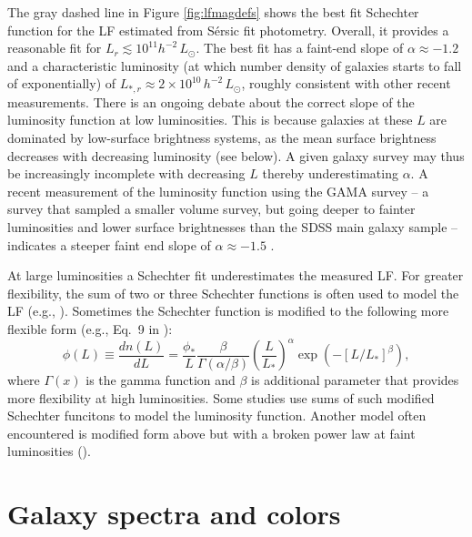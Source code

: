 The gray dashed line in Figure \ref{fig:lfmagdefs} shows the best fit Schechter function for the LF estimated from S\'ersic fit photometry. Overall, it provides a reasonable fit for $L_r\lesssim 10^{11}h^{-2}\, L_{\odot}$. The best fit has a faint-end slope of $\alpha\approx -1.2$ and a characteristic luminosity (at which number density of galaxies starts to fall of exponentially) of $L_{\ast,r}\approx 2\times 10^{10}\, h^{-2}\, L_{\odot}$, roughly consistent with other recent measurements. There is an ongoing debate about the correct slope of the luminosity function at low luminosities. This is because galaxies at these $L$ are dominated by low-surface brightness systems, as the mean surface brightness decreases with decreasing luminosity (see below). A given galaxy survey may thus be increasingly incomplete with decreasing $L$ thereby underestimating $\alpha$. A recent measurement of the luminosity function using the GAMA survey -- a survey that sampled a smaller volume survey, but going deeper to fainter luminosities and lower surface brightnesses than the SDSS main galaxy sample -- indicates a steeper faint end slope of $\alpha\approx -1.5$ \href{http://adsabs.harvard.edu/abs/2012MNRAS.421..621B}{\citep{baldry_etal12}}. 

At large luminosities a Schechter fit underestimates the measured LF. For greater flexibility, the sum of two or three Schechter functions is often used to model the LF (e.g., \href{http://adsabs.harvard.edu/abs/2009MNRAS.398.2177L}{\citealt{li_white09}}). Sometimes the Schechter function is modified to the following more flexible form (e.g.,  Eq.~9 in \href{http://adsabs.harvard.edu/abs/2010MNRAS.404.2087B}{\citealt{bernardi_etal10}}):
\begin{equation}
\phi(L)\equiv\frac{dn(L)}{dL}=\frac{\phi_*}{L}\frac{\beta}{\Gamma(\alpha/\beta)} \left(\frac{L}{L_*}\right)^{\alpha}\exp(-[L/L_*]^\beta),
\label{eq:lfLschechtermod}
\end{equation}
where $\Gamma(x)$ is the gamma function and $\beta$ is additional parameter that provides more flexibility at high luminosities. Some studies use sums of such modified Schechter funcitons to model the luminosity function. Another model often encountered is modified form above but with a broken power law at faint luminosities (\href{http://adsabs.harvard.edu/abs/2005ApJ...631..208B}{\citealt{blanton_etal05}}).

\section{Galaxy spectra and colors}


